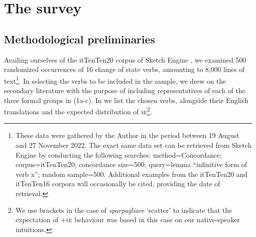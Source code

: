 \documentclass[output=paper,colorlinks,citecolor=brown
]{langscibook}
\begin{document}
\section{The survey}
\label{bentley_section_3}
\subsection{Methodological preliminaries}
\label{bentley_section_3.1}
Availing ourselves of the itTenTen20 corpus of Sketch Engine \citep{jakubicek2013tenten}, we examined 500 randomized occurrences of 16 change of state verbs, amounting to 8,000 lines of text\footnote{These data were gathered by the Author in the period between 19 August and 27 November 2022. The exact same data set can be retrieved from Sketch Engine by conducting the following searches: method=Concordance; corpus=itTenTen20; concordance size=500; query=lemma “infinitive form of verb x”; random sample=500. Additional examples from the itTenTen20 and itTenTen16 corpora \citep{jakubicek2013tenten} will occasionally be cited, providing the date of retrieval.}.  In selecting the verbs to be included in the sample, we drew on the secondary literature \citep{folli2005consuming,cennamo2012aspectual,cennamo2021anticausatives,cennamo2011anticausative,alexiadou2015external,bentley2023internally} with the purpose of including representatives of each of the three formal groups in (1a-c). In  we list the chosen verbs, alongside their English translations and the expected distribution of \textsc{se}\footnote{We use brackets in the case of \textit{sparpagliare} ‘scatter’ to indicate that the expectation of +\textsc{se} behaviour was based in this case on our native-speaker intuitions.}. 
\end{document}
